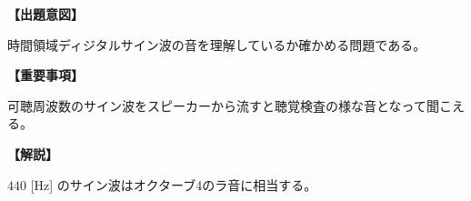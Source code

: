 \noindent \textbf{【出題意図】}

\noindent 時間領域ディジタルサイン波の音を理解しているか確かめる問題である。

\vspace{1em}
\noindent \textbf{【重要事項】}

\bigskip
\noindent\quad 可聴周波数のサイン波をスピーカーから流すと聴覚検査の様な音となって聞こえる。


\vspace{1em}
\noindent \textbf{【解説】}

\noindent $440$ [Hz] のサイン波はオクターブ4のラ音に相当する。
